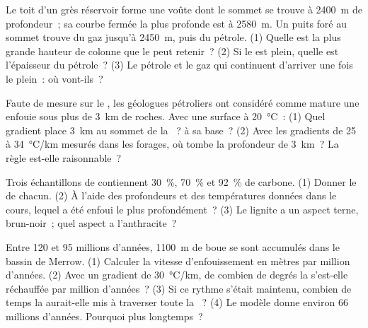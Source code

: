 \begin{exercise}[$\star\star$]\label{exo:g11:fossil-fuel-geology:9}
Le toit d'un grès réservoir forme une voûte dont le sommet se trouve à
\qty{2400}{m} de profondeur~; sa courbe fermée la plus profonde est à
\qty{2580}{m}. Un puits foré au sommet trouve du gaz jusqu'à
\qty{2450}{m}, puis du pétrole. (1) Quelle est la plus grande hauteur de
colonne que le  peut retenir~? (2) Si le  est plein, quelle est
l'épaisseur du pétrole~? (3) Le pétrole et le gaz qui continuent d'arriver
une fois le  plein~: où vont-ils~?
\end{exercise}

\begin{exercise}[$\star\star$]\label{exo:g11:fossil-fuel-geology:10}
Faute de mesure sur le , les géologues pétroliers ont considéré
comme mature une  enfouie sous plus de \qty{3}{km} de roches.
Avec une surface à \qty{20}{\degreeCelsius}~: (1) Quel gradient place
\qty{3}{km} au sommet de la ~? à sa base~? (2) Avec les
gradients de 25 à \qty{34}{\degreeCelsius/km} mesurés dans les forages, où
tombe la profondeur de \qty{3}{km}~? La règle est-elle raisonnable~?
\end{exercise}

\begin{exercise}[$\star\star$]\label{exo:g11:fossil-fuel-geology:11}
Trois échantillons de  contiennent \qty{30}{\percent},
\qty{70}{\percent} et \qty{92}{\percent} de carbone. (1) Donner le  de
chacun. (2) À l'aide des profondeurs et des températures données dans le
cours, lequel a été enfoui le plus profondément~? (3) Le lignite a un
aspect terne, brun-noir~; quel aspect a l'anthracite~?
\end{exercise}

\begin{exercise}[$\star\star\star$]\label{exo:g11:fossil-fuel-geology:12}
Entre 120 et 95 millions d'années, \qty{1100}{m} de boue se sont accumulés
dans le bassin de Merrow. (1) Calculer la vitesse d'enfouissement en mètres
par million d'années. (2) Avec un gradient de \qty{30}{\degreeCelsius/km},
de combien de degrés la  s'est-elle réchauffée par million
d'années~? (3) Si ce rythme s'était maintenu, combien de temps la 
aurait-elle mis à traverser toute la ~? (4) Le modèle donne
environ 66 millions d'années. Pourquoi plus longtemps~?
\end{exercise}

